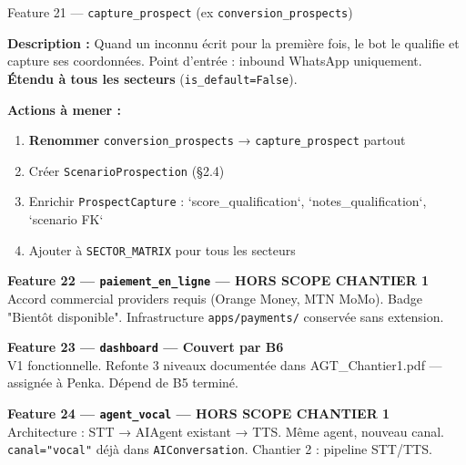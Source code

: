 \documentclass[11pt,a4paper]{article}
\newcommand{\slug}[1]{\texttt{\color{AGTDark}#1}}
\newcommand{\prio}[1]{\textcolor{AGTRed}{\textbf{#1}}}
\begin{document}
\begin{featurebox}{Feature 21 — \slug{capture\_prospect} (ex \slug{conversion\_prospects})}

\textbf{Description :} Quand un inconnu écrit pour la première fois, le bot le qualifie
et capture ses coordonnées. Point d'entrée : inbound WhatsApp uniquement.
\textbf{Étendu à tous les secteurs} (\texttt{is\_default=False}).

\textbf{Actions à mener :}
\begin{enumerate}
  \item \prio{Renommer} \slug{conversion\_prospects} → \slug{capture\_prospect} partout
  \item Créer \slug{ScenarioProspection} (§2.4)
  \item Enrichir \slug{ProspectCapture} : `score\_qualification`, `notes\_qualification`,
        `scenario FK`
  \item Ajouter à \slug{SECTOR\_MATRIX} pour tous les secteurs
\end{enumerate}

\end{featurebox}

\bigskip

\begin{hssbox}
\textbf{Feature 22 — \slug{paiement\_en\_ligne} — HORS SCOPE CHANTIER 1}\\
Accord commercial providers requis (Orange Money, MTN MoMo).
Badge "Bientôt disponible". Infrastructure \slug{apps/payments/} conservée sans extension.
\end{hssbox}

\medskip

\begin{hssbox}
\textbf{Feature 23 — \slug{dashboard} — Couvert par B6}\\
V1 fonctionnelle. Refonte 3 niveaux documentée dans AGT\_Chantier1.pdf — assignée à Penka.
Dépend de B5 terminé.
\end{hssbox}

\medskip

\begin{hssbox}
\textbf{Feature 24 — \slug{agent\_vocal} — HORS SCOPE CHANTIER 1}\\
Architecture : STT → AIAgent existant → TTS. Même agent, nouveau canal.
\slug{canal="vocal"} déjà dans \slug{AIConversation}. Chantier 2 : pipeline STT/TTS.
\end{hssbox}

\bigskip
\end{document}
